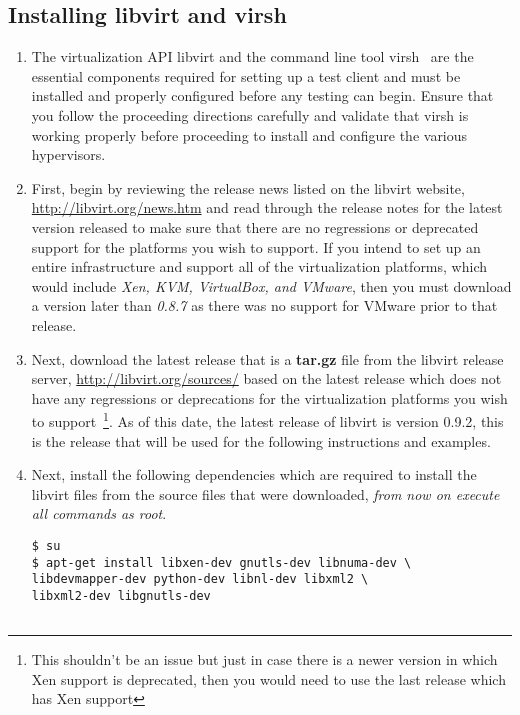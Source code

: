 \subsection{Installing libvirt and virsh}
\label{sec:debianvirsh}
\begin{enumerate}
\item	The virtualization API libvirt and the command line tool virsh~\cite{libvirt} are the essential components required 
		for setting up a test client and must be installed and properly configured before any testing can begin. Ensure that
		you follow the proceeding directions carefully and validate that virsh is working properly before proceeding to 
		install and configure the various hypervisors.
		
\item	First, begin by reviewing the release news listed on the libvirt website, \url{http://libvirt.org/news.htm} and read 
		through the release notes for the latest version released to make sure that there are no regressions or deprecated 
		support for the platforms you wish to support. If you intend to set up an entire infrastructure and support all of the
		\cernvm virtualization platforms, which would include \emph{Xen, KVM, VirtualBox, and VMware}, then you must download
		a version later than \emph{0.8.7} as there was no support for VMware prior to that release.

\item	Next, download the latest release that is a {\bf tar.gz} file from the libvirt release server, 
		\url{http://libvirt.org/sources/} based on the latest release which does not have any regressions or deprecations for
		the virtualization platforms you wish to support~\footnote{This shouldn't be an issue but just in case there is a 
		newer version in which Xen support is deprecated, then you would need to use the last release which has Xen support}.
		As of this date, the latest release of libvirt is version 0.9.2, this is the release that will be used for the
		following instructions and examples.
		
\item	Next, install the following dependencies which are required to install the libvirt files from the source files
			that were downloaded, \emph{from now on execute all commands as root}.

\lstset{language=bash,caption=Install Dependencies}
\begin{lstlisting}
$ su
$ apt-get install libxen-dev gnutls-dev libnuma-dev \
libdevmapper-dev python-dev libnl-dev libxml2 \
libxml2-dev libgnutls-dev 


\end{lstlisting}
\end{enumerate}
